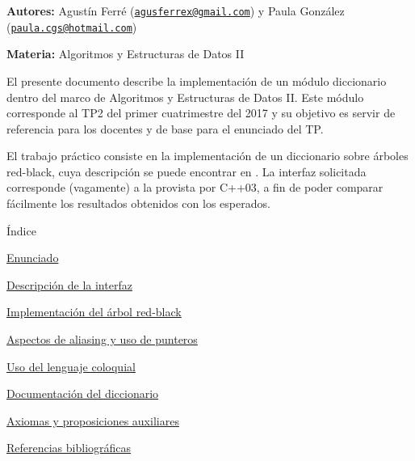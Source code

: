 
\begin{DoxyItemize}
\item {\bfseries Autores\+:} Agustín Ferré (\href{mailto:agusferrex@gmail.com}{\tt agusferrex@gmail.\+com}) y Paula González (\href{mailto:paula.cgs@hotmail.com}{\tt paula.\+cgs@hotmail.\+com})
\item {\bfseries Materia\+:} Algoritmos y Estructuras de Datos II
\end{DoxyItemize}

El presente documento describe la implementación de un módulo diccionario dentro del marco de Algoritmos y Estructuras de Datos II. Este módulo corresponde al T\+P2 del primer cuatrimestre del 2017 y su objetivo es servir de referencia para los docentes y de base para el enunciado del TP.

El trabajo práctico consiste en la implementación de un diccionario sobre árboles red-\/black, cuya descripción se puede encontrar en \cite{CormenLeisersonRivestStein2009}. La interfaz solicitada corresponde (vagamente) a la provista por C++03, a fin de poder comparar fácilmente los resultados obtenidos con los esperados.

\begin{DoxyParagraph}{Índice}

\end{DoxyParagraph}

\begin{DoxyItemize}
\item \hyperlink{Enunciado}{Enunciado}
\item \hyperlink{Interfaz}{Descripción de la interfaz}
\item \hyperlink{Implementacion}{Implementación del árbol red-\/black}
\item \hyperlink{Aliasing}{Aspectos de aliasing y uso de punteros}
\item \hyperlink{Castellano}{Uso del lenguaje coloquial}
\item \hyperlink{classaed2_1_1map}{Documentación del diccionario }
\item \hyperlink{axiomas}{Axiomas y proposiciones auxiliares}
\item \hyperlink{citelist}{Referencias bibliográficas} 
\end{DoxyItemize}
